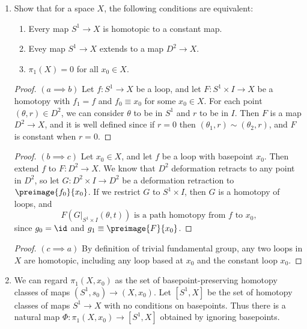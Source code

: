 \documentclass[12pt,letterpaper]{article}
\begin{document}
\begin{enumerate}
\begin{proof}
$(\impliedby)$ Let $f,g$ be loops with the same basepoint, and suppose $\beta_h$ depends only on the endpoints of $h$. Then 
\begin{align*}
f\sqcdot g&\simeq	f\sqcdot g\sqcdot\bar{f}\sqcdot f & \text{by the waiting homotopy}\\
&\simeq g\sqcdot g\sqcdot \bar{g}\sqcdot f & f,g \text{ have the same endpoints}\\
&\simeq g\sqcdot f& \text{by the waiting homotopy} 
\end{align*}\mbox{}\vspace*{-5ex}\qedhere
\end{proof}
\setcounter{enumi}{4}
\item Show that for a space $X$, the following conditions are equivalent: 
\begin{enumerate}[label=(\alph*)]
\item Every map $S^1\to X$ is homotopic to a constant map.
\item Evey map  $S^1\to X$ extends to a map $D^2\to X$. 
\item $\pi_1(X)=0$ for all $x_0\in X$. 
\end{enumerate}
\begin{proof}$(a\implies b)$
Let $f:S^1\to X$ be a loop, and let $F:S^1\times I\to X$ be a homotopy with $f_1=f$ and $f_0\equiv x_0$ for some $x_0\in X$. For each point $(\theta, r)\in D^2$, we can consider $\theta$ to be in $S^1$ and $r$ to be in $I$. Then $F$ is a map $D^2\to X$, and it is well defined since if $r=0$ then $(\theta_1,r)\sim(\theta_2,r)$, and $F$ is constant when $r=0$. 
\end{proof}
\begin{proof}$(b\implies c)$
Let $x_0\in X$, and let $f$ be a loop with basepoint $x_0$. Then extend $f$ to $F:D^2\to X$. We know that $D^2$ deformation retracts to any point in $D^2$, so let $G:D^2\times I \to D^2$  be a deformation retraction to $\preimage{f_0}{x_0}$. If we restrict $G$ to $S^1\times I$, then $G$ is a homotopy of loops, and 
$$F(G|_{S^1\times I}(\theta, t)) \text{ is a path homotopy from $f$ to $x_0$,}$$
since $g_0=\id$ and $g_1\equiv \preimage{F}{x_0}$. 
\end{proof}
\begin{proof}$(c\implies a)$ By definition of trivial fundamental group, any two loops in $X$ are homotopic, including any loop based at $x_0$ and the constant loop $x_0$. 
\end{proof}

\item We can regard $\pi_1(X,x_0)$ as the set of basepoint-preserving homotopy classes of maps $(S^1,s_0)\to(X,x_0)$. Let $[S^1,X]$ be the set of homotopy classes of maps $S^1\to X$ with no conditions on basepoints. Thus there is a natural map $\Phi:\pi_1(X,x_0)\to [S^1,X]$ obtained by ignoring basepoints. 


\end{enumerate}
\end{document}
